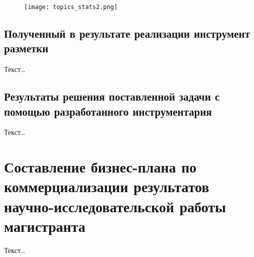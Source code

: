 \documentclass[../main]{subfiles}
\begin{document}
\begin{figure}[H]
    \centering
    {\texttt{[image: topics\_stats2.png]}}
    \vspace{-\baselineskip}
\end{figure}

\subsection{Полученный в результате реализации инструмент разметки}
Текст\dots

\subsection{Результаты решения поставленной задачи с помощью разработанного инструментария}
Текст\dots

\newpage
\section{Составление бизнес-плана по коммерциализации результатов научно-исследовательской работы магистранта}
Текст\dots
\end{document}
